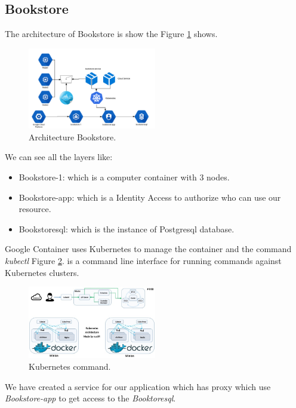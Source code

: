 \documentclass[a4paper]{article}
\begin{document}
\subsection{Bookstore}
The architecture of Bookstore is show the Figure \ref{fig:bookstore} shows.\par
\begin{figure}[!h]
\centering
\includegraphics[width=0.5\textwidth]{bookstore.png}
\caption{\label{fig:bookstore}Architecture Bookstore.}
\end{figure}
We can see all the layers like:
\begin{itemize}
\item Bookstore-1: which is a computer container with 3 nodes.
\item Bookstore-app: which is a Identity Access to authorize who can use our resource.
\item Bookstoresql: which is the instance of Postgresql database.

\end{itemize}

Google Container uses Kubernetes to manage the container \cite{gcontainer} and the command \textit{kubectl} Figure \ref{fig:kubectl}. is a command line interface for running commands against Kubernetes clusters.\par

\begin{figure}[!h]
\centering
\includegraphics[width=0.5\textwidth]{kubectl.jpg}
\caption{\label{fig:kubectl}Kubernetes command.\cite{kubectl}}
\end{figure}


We have created a service for our application which has proxy which use \textit{Bookstore-app} to get access to the \textit{Booktoresql}.\par
\end{document}
